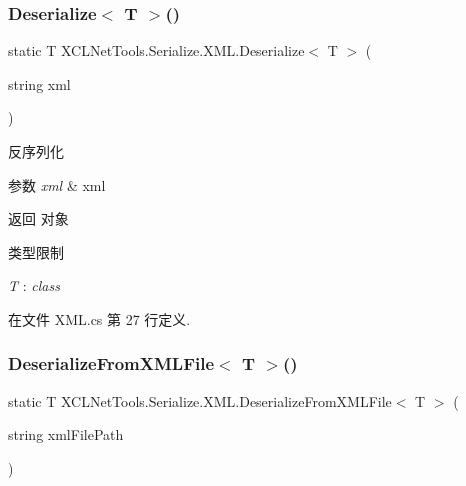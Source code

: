 \subsubsection{\texorpdfstring{Deserialize$<$ T $>$()}{Deserialize< T >()}}
{\footnotesize\ttfamily static T X\+C\+L\+Net\+Tools.\+Serialize.\+X\+M\+L.\+Deserialize$<$ T $>$ (\begin{DoxyParamCaption}\item[{string}]{xml }\end{DoxyParamCaption})\hspace{0.3cm}{\ttfamily [static]}}



反序列化 


\begin{DoxyParams}{参数}
{\em xml} & xml\\
\hline
\end{DoxyParams}
\begin{DoxyReturn}{返回}
对象
\end{DoxyReturn}
\begin{Desc}
\item[类型限制]\begin{description}
\item[{\em T} : {\em class}]\end{description}
\end{Desc}


在文件 X\+M\+L.\+cs 第 27 行定义.

\mbox{\label{class_x_c_l_net_tools_1_1_serialize_1_1_x_m_l_afdebd810bc96d095cab8ccdf8aaca684}} 
\subsubsection{\texorpdfstring{Deserialize\+From\+X\+M\+L\+File$<$ T $>$()}{DeserializeFromXMLFile< T >()}}
{\footnotesize\ttfamily static T X\+C\+L\+Net\+Tools.\+Serialize.\+X\+M\+L.\+Deserialize\+From\+X\+M\+L\+File$<$ T $>$ (\begin{DoxyParamCaption}\item[{string}]{xml\+File\+Path }\end{DoxyParamCaption})\hspace{0.3cm}{\ttfamily [static]}}



